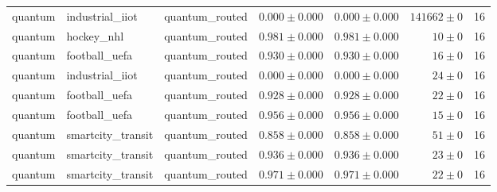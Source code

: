 \begin{table}[htbp]
\begin{tabular}{l l l r r r r}
quantum & industrial\_iiot & quantum\_routed & $0.000\pm0.000$ & $0.000\pm0.000$ & $141662\pm0$ & 16 \\
quantum & hockey\_nhl & quantum\_routed & $0.981\pm0.000$ & $0.981\pm0.000$ & $10\pm0$ & 16 \\
quantum & football\_uefa & quantum\_routed & $0.930\pm0.000$ & $0.930\pm0.000$ & $16\pm0$ & 16 \\
quantum & industrial\_iiot & quantum\_routed & $0.000\pm0.000$ & $0.000\pm0.000$ & $24\pm0$ & 16 \\
quantum & football\_uefa & quantum\_routed & $0.928\pm0.000$ & $0.928\pm0.000$ & $22\pm0$ & 16 \\
quantum & football\_uefa & quantum\_routed & $0.956\pm0.000$ & $0.956\pm0.000$ & $15\pm0$ & 16 \\
quantum & smartcity\_transit & quantum\_routed & $0.858\pm0.000$ & $0.858\pm0.000$ & $51\pm0$ & 16 \\
quantum & smartcity\_transit & quantum\_routed & $0.936\pm0.000$ & $0.936\pm0.000$ & $23\pm0$ & 16 \\
quantum & smartcity\_transit & quantum\_routed & $0.971\pm0.000$ & $0.971\pm0.000$ & $22\pm0$ & 16 \\
\hline
\end{tabular}
\end{table}
